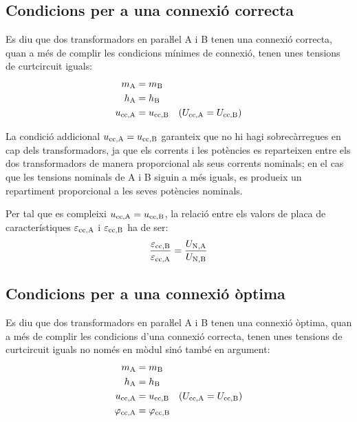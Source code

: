\subsection{Condicions per a una connexió correcta}
 Es diu que dos transformadors en paraŀlel  A i B tenen una connexió correcta, quan a més de complir les condicions mínimes de connexió, tenen unes tensions de curtcircuit iguals:
\begin{align}
    m_\mathrm{A} &= m_\mathrm{B}\\
    h_\mathrm{A} &= h_\mathrm{B}\\
    u_\mathrm{cc,A} &= u_\mathrm{cc,B} \quad (U_\mathrm{cc,A} = U_\mathrm{cc,B})
\end{align}

La condició addicional  $u_\mathrm{cc,A} = u_\mathrm{cc,B}$ garanteix que no hi hagi sobrecàrregues en cap dels transformadors, ja que els corrents i les potències es reparteixen entre els dos transformadors de manera proporcional als seus corrents nominals; en el cas que les tensions nominals de A i B siguin a més iguals, es produeix un repartiment proporcional a les seves potències nominals.

Per tal que es compleixi $u_\mathrm{cc,A} = u_\mathrm{cc,B}$, la relació entre els valors de placa de característiques $\varepsilon_\mathrm{cc,A}$ i $\varepsilon_\mathrm{cc,B}$ ha de ser:
\begin{equation}
    \frac{\varepsilon_\mathrm{cc,B}}{\varepsilon_\mathrm{cc,A}} = \frac{U_\mathrm{N,A}}{U_\mathrm{N,B}}
\end{equation}

\subsection{Condicions per a una connexió òptima}

 Es diu que dos transformadors en paraŀlel A i B tenen una connexió òptima, quan a més de complir les condicions d'una connexió correcta, tenen unes tensions de curtcircuit iguals no només en mòdul sinó també en argument:
\begin{align}
    m_\mathrm{A} &= m_\mathrm{B}\\
    h_\mathrm{A} &= h_\mathrm{B}\\
    u_\mathrm{cc,A} &= u_\mathrm{cc,B} \quad (U_\mathrm{cc,A} = U_\mathrm{cc,B})\\
    \varphi_\mathrm{cc,A} &=\varphi_\mathrm{cc,B}
\end{align}

